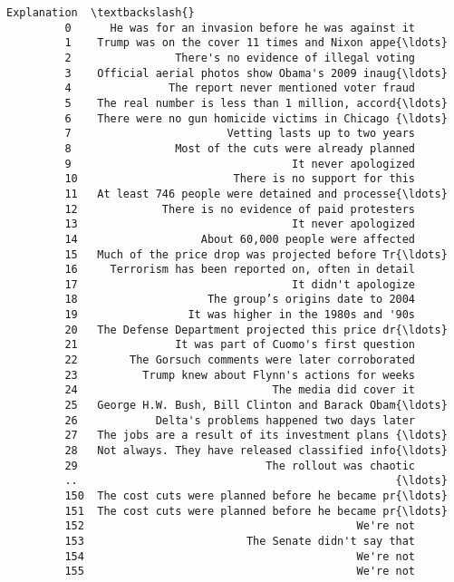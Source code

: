 \documentclass[11pt]{article}
\begin{document}
\begin{Verbatim}[commandchars=\\\{\}]
                                                    Explanation  \textbackslash{}
         0      He was for an invasion before he was against it   
         1    Trump was on the cover 11 times and Nixon appe{\ldots}   
         2                There's no evidence of illegal voting   
         3    Official aerial photos show Obama's 2009 inaug{\ldots}   
         4               The report never mentioned voter fraud   
         5    The real number is less than 1 million, accord{\ldots}   
         6    There were no gun homicide victims in Chicago {\ldots}   
         7                        Vetting lasts up to two years   
         8                Most of the cuts were already planned   
         9                                  It never apologized   
         10                        There is no support for this   
         11   At least 746 people were detained and processe{\ldots}   
         12             There is no evidence of paid protesters   
         13                                 It never apologized   
         14                   About 60,000 people were affected   
         15   Much of the price drop was projected before Tr{\ldots}   
         16     Terrorism has been reported on, often in detail   
         17                                 It didn't apologize   
         18                    The group’s origins date to 2004   
         19                 It was higher in the 1980s and '90s   
         20   The Defense Department projected this price dr{\ldots}   
         21               It was part of Cuomo's first question   
         22        The Gorsuch comments were later corroborated   
         23          Trump knew about Flynn's actions for weeks   
         24                              The media did cover it   
         25   George H.W. Bush, Bill Clinton and Barack Obam{\ldots}   
         26            Delta's problems happened two days later   
         27   The jobs are a result of its investment plans {\ldots}   
         28   Not always. They have released classified info{\ldots}   
         29                             The rollout was chaotic   
         ..                                                 {\ldots}   
         150  The cost cuts were planned before he became pr{\ldots}   
         151  The cost cuts were planned before he became pr{\ldots}   
         152                                          We're not   
         153                         The Senate didn't say that   
         154                                          We're not   
         155                                          We're not   

\end{Verbatim}
\end{document}
